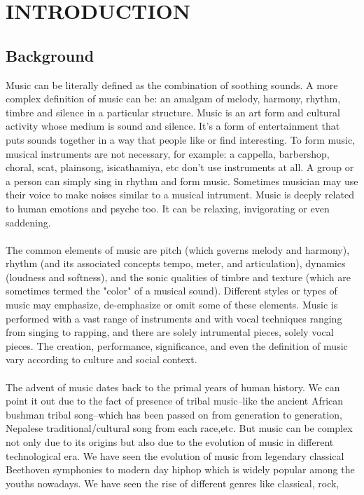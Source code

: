 \newpage
\section{INTRODUCTION}

\subsection{Background}

Music can be literally defined as the combination of soothing sounds. A more complex definition of music can be: an amalgam of 
melody, harmony, rhythm, timbre and silence in a particular structure. Music is an art form and cultural activity whose medium is sound and silence. It's a 
form of entertainment that puts sounds together in a way that people like or find interesting. To form music, musical instruments are not necessary,
for example: a cappella, barbershop, choral, scat, plainsong, isicathamiya, etc don't use instruments at all.
A group or a person can simply sing in rhythm and form music. Sometimes musician may use their voice to make noises similar to a musical intrument.
Music is deeply related to human emotions \cite{Juslin2001} and psyche too. It can be relaxing, invigorating or even saddening. \\
\\
The common elements of music are pitch (which governs melody and harmony), rhythm (and its associated concepts tempo, meter, and articulation),
dynamics (loudness and softness), and the sonic qualities of timbre and texture (which are sometimes termed the "color" of a musical sound). Different styles
or types of music may emphasize, de-emphasize or omit some of these elements. Music is performed with a vast range of instruments and with 
vocal techniques ranging from singing to rapping, and there are solely intrumental pieces, solely vocal pieces. The creation, performance, significance,
and even the definition of music vary according to culture and social context.\\
\\
The advent of music dates back to the primal years of human history. We can point it out due to the fact of presence of tribal music--like the ancient African bushman tribal song--which has been passed on
from generation to generation, Nepalese traditional/cultural song from each race,etc. 
But music can be complex not only due to its origins but also due to the evolution of music in different technological era. 
We have seen the evolution of music from legendary classical Beethoven symphonies to modern day hiphop which is widely popular among the youths nowadays. We have seen the rise of different genres like classical, rock,
